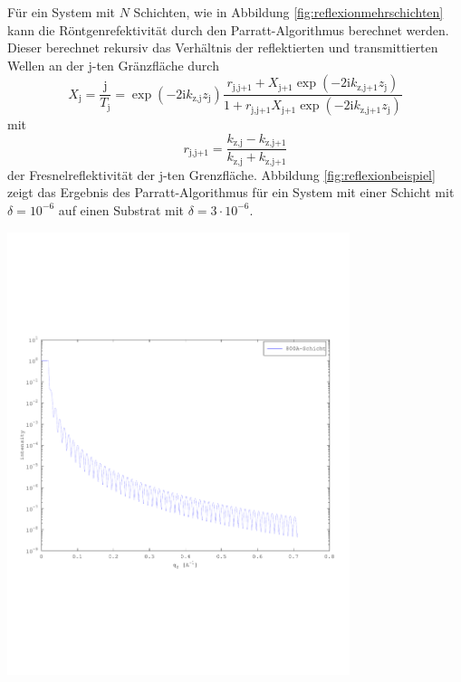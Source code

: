 \documentclass[captions=tableheading]{scrartcl}
\newcommand{\im}{\mathrm{i}}
\newcommand{\indx}[1]{\text{#1}}
\begin{document}
Für ein System mit $N$ Schichten, wie in Abbildung \ref{fig:reflexionmehrschichten} kann die Röntgenrefektivität durch den Parratt-Algorithmus berechnet werden. 
Dieser berechnet rekursiv das Verhältnis der reflektierten und transmittierten Wellen an der j-ten Gränzfläche durch
\begin{equation}
X_\indx{j}=\frac{\indx{j}}{T_\indx{j}}=\exp \left(-2\im k_\indx{z,j}z_\indx{j} \right)\frac{r_\indx{j,j+1} + X_\indx{j+1}\exp\left(-2\im k_\indx{z,j+1}z_\indx{j}\right) }{ 1+r_\indx{j,j+1}X_\indx{j+1}\exp\left(-2\im k_\indx{z,j+1}z_\indx{j}\right) }
\end{equation}
mit
\begin{equation}
r_\indx{j,j+1}= \frac{k_\indx{z,j}-k_\indx{z,j+1}}{k_\indx{z,j}+k_\indx{z,j+1}}
\end{equation}
der Fresnelreflektivität der j-ten Grenzfläche. 
Abbildung \ref{fig:reflexionbeispiel} zeigt das Ergebnis des Parratt-Algorithmus für ein System mit einer Schicht mit $\delta=10^{-6}$ auf einen  Substrat mit $\delta = 3\cdot 10^{-6}$.
\begin{center}
	\includegraphics[width=10cm]{images/reflektivitaet_schicht.pdf}
	\label{fig:reflexionbeispiel}
\end{center}
\end{document}
